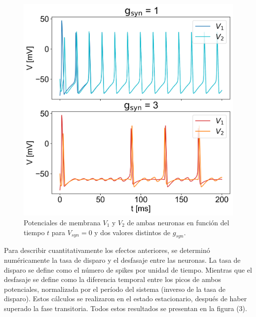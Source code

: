 \documentclass[aps,prb,twocolumn,superscriptaddress,floatfix,longbibliography]{revtex4-2}
\newcounter{para}
\begin{document}
\begin{figure}[h]
    \includegraphics[clip=true,width=\columnwidth]{ej1_potenciales_vs_gsyn.png}
    \caption{Potenciales de membrana $V_1$ y $V_2$ de ambas neuronas en función del tiempo $t$ para $V_{syn} = 0$ y dos valores distintos de $g_{syn}$.}
    \label{fig:ej1_potenciales_vs_gsyn}
\end{figure}

Para describir cuantitativamente los efectos anteriores, se determinó numéricamente la tasa de disparo y el desfasaje entre las neuronas. La tasa de disparo se define como el número de spikes por unidad de tiempo. Mientras que el desfasaje se define como la diferencia temporal entre los picos de ambos potenciales, normalizada por el período del sistema (inverso de la tasa de disparo). Estos cálculos se realizaron en el estado estacionario, después de haber superado la fase transitoria. Todos estos resultados se presentan en la figura (3).
\end{document}
